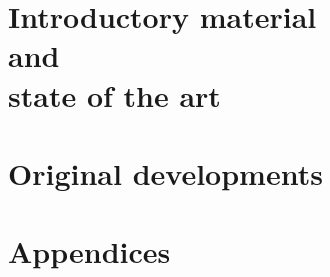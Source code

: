 \documentclass[11pt,%
               a4paper,%
               twoside,openright,%
               titlepage,%
               headinclude,,footinclude,%
               BCOR=5mm,%
               cleardoublepage=empty,%
               captions=tableheading,%
               ]{scrreprt}                 %
\begin{document}
\pagestyle{scrheadings}
 




%
%


\cleardoublepage
\part[Literature]{Introductory material\protect\\ and \protect\\state of the art} %

\part{Original developments}


\appendix
\part*{Appendices}



%

\end{document}
